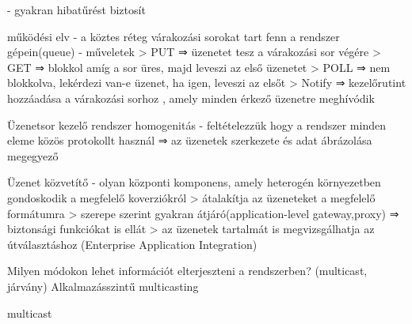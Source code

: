 \documentclass[twoside, a4paper, 12pt]{article}
\begin{document}
\begin{description}
                                                                        - gyakran hibatűrést biztosít
                                                                    \item működési elv
                                                                        - a köztes réteg várakozási sorokat tart fenn a rendszer gépein(queue)
                                                                        - műveletek
                                                                        > PUT    ⇒ üzenetet tesz a várakozási sor végére
                                                                        > GET    ⇒ blokkol amíg a sor üres, majd leveszi az első üzenetet
                                                                        > POLL 	 ⇒ nem blokkolva, lekérdezi van-e üzenet, ha igen, leveszi az elsőt
                                                                        > Notify ⇒	kezelőrutint hozzáadása a várakozási sorhoz , amely minden érkező üzenetre meghívódik
                                                                    \item Üzenetsor kezelő rendszer homogenitás
                                                                        - feltételezzük hogy a rendszer minden eleme közös protokollt használ
                                                                        ⇒ az üzenetek szerkezete és adat ábrázolása megegyező
                                                                    \item Üzenet közvetítő
                                                                        - olyan központi komponens, amely heterogén környezetben gondoskodik a megfelelő koverziókról
                                                                        > átalakítja az üzeneteket a megfelelő formátumra
                                                                        > szerepe szerint gyakran átjáró(application-level gateway,proxy) ⇒ biztonsági funkciókat is ellát
                                                                        > az üzenetek tartalmát is megvizsgálhatja az útválasztáshoz (Enterprise Application Integration)	
                                                                    \item  Milyen módokon lehet információt elterjeszteni a rendszerben? (multicast, járvány)
                                                                        Alkalmazásszintű multicasting
                                                                    \item multicast 

\end{description}
\end{document}
